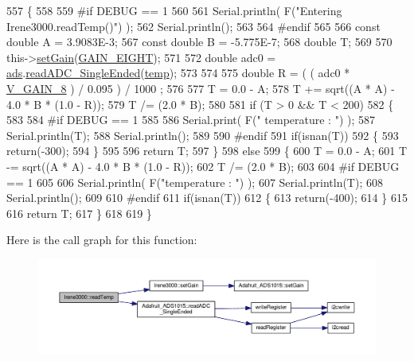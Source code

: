 \begin{DoxyCode}
557 \{
558 
559 \textcolor{preprocessor}{#if DEBUG == 1 }
560 
561     Serial.println( F(\textcolor{stringliteral}{"Entering Irene3000.readTemp()"}) );
562     Serial.println();
563 
564 \textcolor{preprocessor}{#endif}
565 
566     \textcolor{keyword}{const} \textcolor{keywordtype}{double} A = 3.9083E-3;
567     \textcolor{keyword}{const} \textcolor{keywordtype}{double} B = -5.775E-7;
568     \textcolor{keywordtype}{double} T;
569 
570     this->\hyperlink{class_irene3000_aff7c5da186b388e7272e63ff88a20c34}{setGain}(\hyperlink{_cool_adafruit___a_d_s1015_8h_a3d6c0e15829a207b9155890811fa4781af284da818fc21db27c5ffcfaff7047cb}{GAIN\_EIGHT});
571 
572     \textcolor{keywordtype}{double} adc0 = \hyperlink{class_irene3000_a1215e77ba761c9908d80d691f149e135}{ads}.\hyperlink{class_adafruit___a_d_s1015_a40f38b9e1f3ec397c0670dd632510235}{readADC\_SingleEnded}(\hyperlink{_irene3000_8h_a5905d48604152cf57aa6bfa087b49173}{temp});
573 
574 
575     \textcolor{keywordtype}{double} R = ( ( adc0 * \hyperlink{_irene3000_8h_ab7ab16df599d3f0ce29e12791a504891}{V\_GAIN\_8} ) / 0.095 ) / 1000 ;
576 
577     T = 0.0 - A;
578     T += sqrt((A * A) - 4.0 * B * (1.0 - R));
579     T /= (2.0 * B);
580 
581     \textcolor{keywordflow}{if} (T > 0 && T < 200) 
582     \{
583 
584 \textcolor{preprocessor}{    #if DEBUG == 1 }
585 
586         Serial.print( F(\textcolor{stringliteral}{" temperature : "}) );
587         Serial.println(T);
588         Serial.println();
589     
590 \textcolor{preprocessor}{    #endif }
591         \textcolor{keywordflow}{if}(isnan(T))
592         \{
593             \textcolor{keywordflow}{return}(-300);           
594         \}
595 
596         \textcolor{keywordflow}{return} T;
597     \}
598     \textcolor{keywordflow}{else} 
599     \{
600         T = 0.0 - A;
601         T -= sqrt((A * A) - 4.0 * B * (1.0 - R));
602         T /= (2.0 * B);
603     
604 \textcolor{preprocessor}{    #if DEBUG == 1 }
605     
606         Serial.println( F(\textcolor{stringliteral}{"temperature : "}) );
607         Serial.println(T);
608         Serial.println();
609     
610 \textcolor{preprocessor}{    #endif}
611         \textcolor{keywordflow}{if}(isnan(T))
612         \{
613             \textcolor{keywordflow}{return}(-400);           
614         \}
615 
616         \textcolor{keywordflow}{return} T;
617     \}
618 
619 \}
\end{DoxyCode}
Here is the call graph for this function\+:\nopagebreak
\begin{figure}[H]
\begin{center}
\leavevmode
\includegraphics[width=350pt]{d6/d03/class_irene3000_a80bc6dfea106dc3bc54fa20204d4d5dc_cgraph}
\end{center}
\end{figure}
